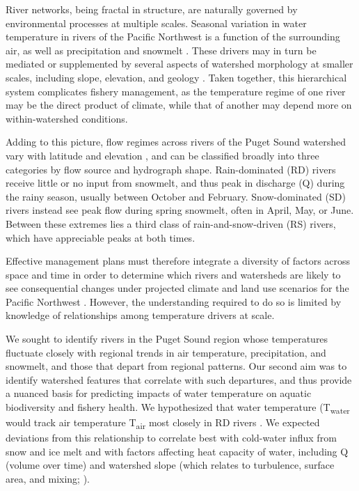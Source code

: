 \documentclass[notitlepage]{article}
\begin{document}
River networks, being fractal in structure, are naturally governed by environmental processes at multiple scales. Seasonal variation in water temperature in rivers of the Pacific Northwest is a function of the surrounding air, as well as precipitation and snowmelt \citep{eldridge1967water}. These drivers may in turn be mediated or supplemented by several aspects of watershed morphology at smaller scales, including slope, elevation, and geology \citep{poole2001ecological,lisi2013association}. Taken together, this hierarchical system complicates fishery management, as the temperature regime of one river may be the direct product of climate, while that of another may depend more on within-watershed conditions.

Adding to this picture, flow regimes across rivers of the Puget Sound watershed vary with latitude and elevation \citep{reidy2012hydrogeomorphic,mauger2015CIG}, and can be classified broadly into three categories by flow source and hydrograph shape. Rain-dominated (RD) rivers receive little or no input from snowmelt, and thus peak in discharge (Q) during the rainy season, usually between October and February. Snow-dominated (SD) rivers instead see peak flow during spring snowmelt, often in April, May, or June. Between these extremes lies a third class of rain-and-snow-driven (RS) rivers, which have appreciable peaks at both times.

Effective management plans must therefore integrate a diversity of factors across space and time in order to determine which rivers and watersheds are likely to see consequential changes under projected climate and land use scenarios for the Pacific Northwest \citep{mote2010future,radeloff2012economic}. However, the understanding required to do so is limited by knowledge of relationships among temperature drivers at scale.


We sought to identify rivers in the Puget Sound region whose temperatures fluctuate closely with regional trends in air temperature, precipitation, and snowmelt, and those that depart from regional patterns. Our second aim was to identify watershed features that correlate with such departures, and thus provide a nuanced basis for predicting impacts of water temperature on aquatic biodiversity and fishery health. We hypothesized that water temperature (T\textsubscript{water} would track air temperature T\textsubscript{air} most closely in RD rivers \citep{ward1985thermal,garner2014river}. We expected deviations from this relationship to correlate best with cold-water influx from snow and ice melt \citep{lisi2015watershed} and with factors affecting heat capacity of water, including Q (volume over time) and watershed slope (which relates to turbulence, surface area, and mixing; \citealt{van2013global}).
\end{document}
